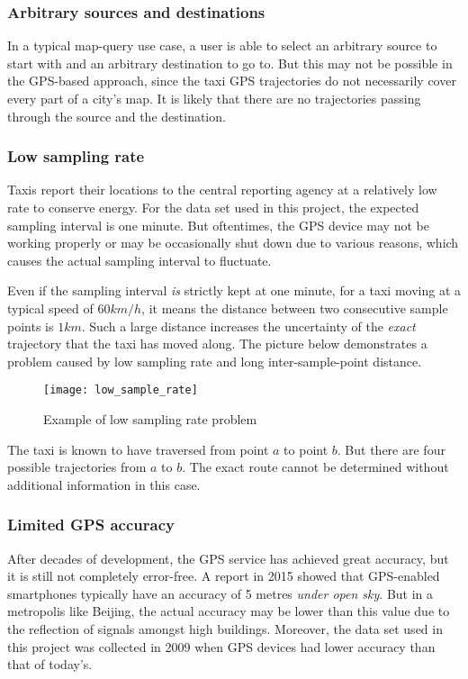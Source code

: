 \subsubsection{Arbitrary sources and destinations}
In a typical map-query use case, a user is able to select an arbitrary source to start with and an arbitrary destination to go to. But this may not be possible in the GPS-based approach, since the taxi GPS trajectories do not necessarily cover every part of a city's map. It is likely that there are no trajectories passing through the source and the destination.
\subsubsection{Low sampling rate}
Taxis report their locations to the central reporting agency at a relatively low rate to conserve energy. For the data set used in this project, the expected sampling interval is one minute. But oftentimes, the GPS device may not be working properly or may be occasionally shut down due to various reasons, which causes the actual sampling interval to fluctuate. 

Even if the sampling interval \emph{is} strictly kept at one minute, for a taxi moving at a typical speed of $60km/h$, it means the distance between two consecutive sample points is $1km$. Such a large distance increases the uncertainty of the \emph{exact} trajectory that the taxi has moved along. The picture\cite{TDR10} below demonstrates a problem caused by low sampling rate and long inter-sample-point distance.
\begin{figure}[h]
\texttt{[image: low\_sample\_rate]}
\centering
\caption{Example of low sampling rate problem}
\end{figure}

The taxi is known to have traversed from point $a$ to point $b$. But there are four possible trajectories from $a$ to $b$. The exact route cannot be determined without additional information in this case.
\subsubsection{Limited GPS accuracy}
After decades of development, the GPS service has achieved great accuracy, but it is still not completely error-free. A report\cite{FP15} in 2015 showed that GPS-enabled smartphones typically have an accuracy of 5 metres \emph{under open sky}. But in a metropolis like Beijing, the actual accuracy may be lower than this value due to the reflection of signals amongst high buildings. Moreover, the data set used in this project was collected in 2009 when GPS devices had lower accuracy than that of today's.

